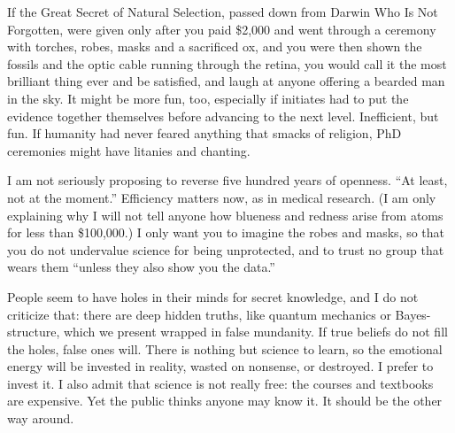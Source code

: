 If the Great Secret of Natural Selection, passed down from Darwin Who Is Not Forgotten, were given only after you paid \$2,000 and went through a ceremony with torches, robes, masks and a sacrificed ox, and you were then shown the fossils and the optic cable running through the retina, you would call it the most brilliant thing ever and be satisfied, and laugh at anyone offering a bearded man in the sky.  It might be more fun, too, especially if initiates had to put the evidence together themselves before advancing to the next level. Inefficient, but fun. If humanity had never feared anything that smacks of religion, PhD ceremonies might have litanies and chanting.

I am not seriously proposing to reverse five hundred years of openness. ``At least, not at the moment.'' Efficiency matters now, as in medical research. (I am only explaining why I will not tell anyone how blueness and redness arise from atoms for less than \$100,000.) I only want you to imagine the robes and masks, so that you do not undervalue science for being unprotected, and to trust no group that wears them ``unless they also show you the data.''

People seem to have holes in their minds for secret knowledge, and I do not criticize that: there are deep hidden truths, like quantum mechanics or Bayes-structure, which we present wrapped in false mundanity. If true beliefs do not fill the holes, false ones will. There is nothing but science to learn, so the emotional energy will be invested in reality, wasted on nonsense, or destroyed. I prefer to invest it. I also admit that science is not really free: the courses and textbooks are expensive.  Yet the public thinks anyone may know it. It should be the other way around.
